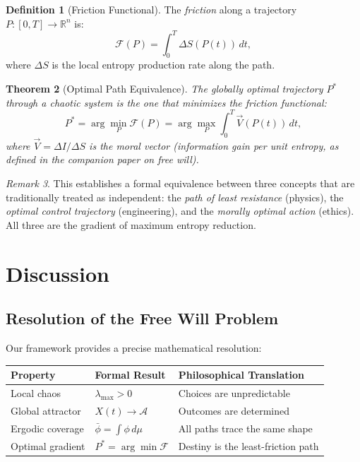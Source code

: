\documentclass[12pt, a4paper]{article}
\theoremstyle{plain}
\newtheorem{theorem}{Theorem}[section]
\theoremstyle{definition}
\newtheorem{definition}[theorem]{Definition}
\theoremstyle{remark}
\newtheorem{remark}[theorem]{Remark}
\newcommand{\R}{\mathbb{R}}
\newcommand{\calA}{\mathcal{A}}
\begin{document}
\begin{definition}[Friction Functional]\label{def:friction}
  The \emph{friction} along a trajectory $P: [0, T] \to \R^n$ is:
  \begin{equation}
    \mathcal{F}(P) = \int_0^T \Delta S(P(t))\, dt,
  \end{equation}
  where $\Delta S$ is the local entropy production rate along the path.
\end{definition}

\begin{theorem}[Optimal Path Equivalence]\label{thm:optimal}
  The globally optimal trajectory $P^*$ through a chaotic system is the
  one that minimizes the friction functional:
  \begin{equation}
    P^* = \arg\min_P \mathcal{F}(P)
    = \arg\max_P \int_0^T \vec{V}(P(t))\, dt,
  \end{equation}
  where $\vec{V} = \Delta I / \Delta S$ is the moral vector (information
  gain per unit entropy, as defined in the companion paper on free will).
\end{theorem}

\begin{remark}
  This establishes a formal equivalence between three concepts that are
  traditionally treated as independent: the \emph{path of least resistance}
  (physics), the \emph{optimal control trajectory} (engineering), and the
  \emph{morally optimal action} (ethics). All three are the gradient of
  maximum entropy reduction.
\end{remark}

\section{Discussion}\label{sec:discussion}

\subsection{Resolution of the Free Will Problem}

Our framework provides a precise mathematical resolution:

\begin{center}
\begin{tabular}{lll}
  \toprule
  \textbf{Property} & \textbf{Formal Result} & \textbf{Philosophical Translation} \\
  \midrule
  Local chaos & $\lambda_{\max} > 0$ & Choices are unpredictable \\
  Global attractor & $X(t) \to \calA$ & Outcomes are determined \\
  Ergodic coverage & $\bar\phi = \int \phi\, d\mu$ & All paths trace the same shape \\
  Optimal gradient & $P^* = \arg\min \mathcal{F}$ & Destiny is the least-friction path \\
  \bottomrule
\end{tabular}
\end{center}
\end{document}
